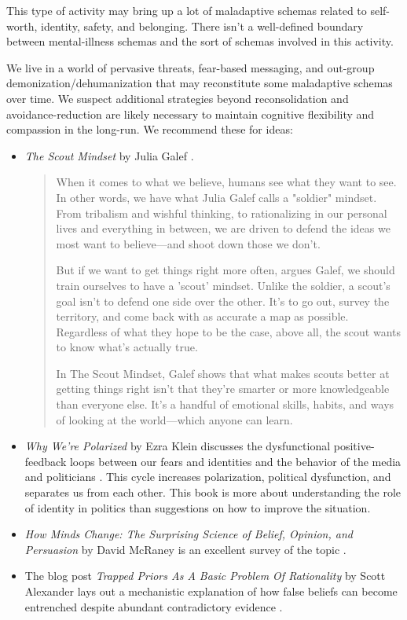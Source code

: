 \documentclass[12pt,letterpaper]{book}
\begin{document}
This type of activity may bring up a lot of maladaptive schemas related to self-worth, identity, safety, and belonging. There isn't a well-defined boundary between mental-illness schemas and the sort of schemas involved in this activity.

We live in a world of pervasive threats, fear-based messaging, and out-group demonization/dehumanization that may reconstitute some maladaptive schemas over time. We suspect additional strategies beyond reconsolidation and avoidance-reduction are likely necessary to maintain cognitive flexibility and compassion in the long-run. We recommend these for ideas:
\begin{itemize}
    \item \textit{The Scout Mindset} by Julia Galef \cite{galefScoutMindset}.
    \begin{quotation}
        When it comes to what we believe, humans see what they want to see. In other words, we have what Julia Galef calls a "soldier" mindset. From tribalism and wishful thinking, to rationalizing in our personal lives and everything in between, we are driven to defend the ideas we most want to believe—and shoot down those we don't.

        But if we want to get things right more often, argues Galef, we should train ourselves to have a 'scout' mindset. Unlike the soldier, a scout's goal isn't to defend one side over the other. It's to go out, survey the territory, and come back with as accurate a map as possible. Regardless of what they hope to be the case, above all, the scout wants to know what's actually true.
        
        In The Scout Mindset, Galef shows that what makes scouts better at getting things right isn't that they're smarter or more knowledgeable than everyone else. It's a handful of emotional skills, habits, and ways of looking at the world—which anyone can learn.
    \end{quotation}
    \item \textit{Why We're Polarized} by Ezra Klein discusses the dysfunctional positive-feedback loops between our fears and identities and the behavior of the media and politicians \cite{klein2020Polarized}. This cycle increases polarization, political dysfunction, and separates us from each other. This book is more about understanding the role of identity in politics than suggestions on how to improve the situation.
    \item \textit{How Minds Change: The Surprising Science of Belief, Opinion, and Persuasion} by David McRaney is an excellent survey of the topic \cite{mcraneyMinds}.
    \item The blog post \textit{Trapped Priors As A Basic Problem Of Rationality} by Scott Alexander lays out a mechanistic explanation of how false beliefs can become entrenched despite abundant contradictory evidence \cite{alexanderTrapped}.
\end{itemize}
\end{document}
